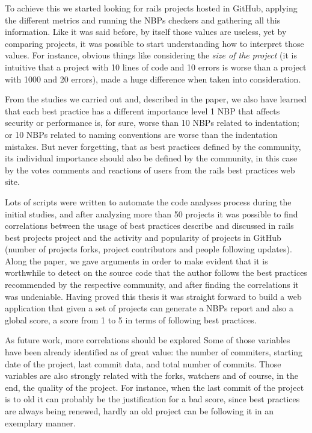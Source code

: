 To achieve this we started looking for rails projects hosted in GitHub, 
applying the different metrics and running the NBPs checkers and gathering all this information.
Like it was said before, by itself those values are useless, yet
by comparing projects, it was possible to start understanding how to interpret those values.
For instance, obvious things like considering the \emph{size of the project}
(it is intuitive that a project with 10 lines of code and 10 errors is worse than a project with 1000 and 20 errors),
made a huge difference when taken into consideration.

From the studies we carried out and, described in the paper,
we also have learned that each best practice has a different importance level
1 NBP that affects security or performance is, for sure, worse than 10 NBPs related to indentation;
or 10 NBPs related to naming conventions are worse than the indentation mistakes.
But never forgetting, that as best practices defined by the community, 
its individual importance should also be defined by the community,
in this case by the votes comments and reactions of users from the rails best practices web site.

Lots of scripts were written to automate the code analyses process during the initial studies, 
and after analyzing more than 50 projects it was possible to find correlations
between the usage of best practices describe and discussed in rails best projects project and
the activity and popularity of projects in GitHub (number of projects forks, project contributors and people following updates).
Along the paper, we gave arguments in order to make evident that it is worthwhile to detect on the source code
that the author follows the best practices recommended by the respective community, 
and after finding the correlations it was undeniable.
Having proved this thesis it was straight forward to build a web application that 
given a set of projects can generate a NBPs report and also a global score, 
a score from 1 to 5 in terms of following best practices.

As future work, more correlations should be explored
Some of those variables have been already identified as of great value: the number of commiters, starting date of the project, last commit data, and total number of commits. 
Those variables are also strongly related with the forks, watchers and of course, in the end, the quality of the project.
For instance, when the last commit of the project is to old it can probably be the justification for a bad score, 
since best practices are always being renewed, hardly an old project can be following it in an exemplary manner.

